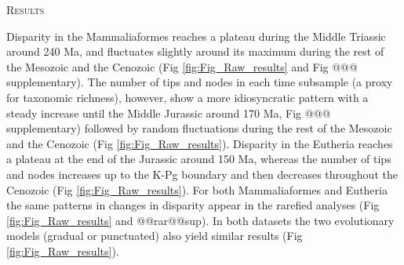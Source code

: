 \documentclass[12pt,letterpaper]{article}
\renewcommand{\section}[1]{%
\bigskip
\begin{center}
\begin{Large}
\normalfont\scshape #1
\medskip
\end{Large}
\end{center}}
\begin{document}

%
%

\section{Results}
Disparity in the Mammaliaformes reaches a plateau during the Middle Triassic around 240 Ma, and fluctuates slightly around its maximum during the rest of the Mesozoic and the Cenozoic (Fig \ref{fig:Fig_Raw_results} and Fig @@@ supplementary).
The number of tips and nodes in each time subsample (a proxy for taxonomic richness), however, show a more idiosyncratic pattern with a steady increase until the Middle Jurassic around 170 Ma, Fig @@@ supplementary) followed by random fluctuations during the rest of the Mesozoic and the Cenozoic (Fig \ref{fig:Fig_Raw_results}).
Disparity in the Eutheria reaches a plateau at the end of the Jurassic around 150 Ma, whereas the number of tips and nodes increases up to the K-Pg boundary and then decreases throughout the Cenozoic (Fig \ref{fig:Fig_Raw_results}).
For both Mammaliaformes and Eutheria the same patterns in changes in disparity appear in the rarefied analyses (Fig \ref{fig:Fig_Raw_results} and @@rar@@sup).
In both datasets the two evolutionary models (gradual or punctuated) also yield similar results (Fig \ref{fig:Fig_Raw_results}).
\end{document}
